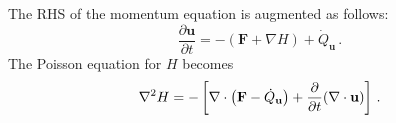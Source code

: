 \documentclass[11pt]{book}
\begin{document}

The RHS of the momentum equation is augmented as follows:
\begin{equation}
\label{eqn_mms_u_eqn}
\frac{\partial \mathbf{u}}{\partial t} = - ( \mathbf{F} + \nabla H ) + \dot{Q}_{\mathbf{u}} \,\mbox{.}
\end{equation}
The Poisson equation for $H$ becomes
\begin{align}
\label{eqn_poisson_mms}
\nabla^2 H = - \left[ \nabla\cdot \left( \mathbf{F} - \dot{Q}_{\mathbf{u}} \right) + \frac{\partial}{\partial t} (\nabla\cdot\mathbf{u}) \right] \,\mbox{.}
\end{align}

\end{document}
